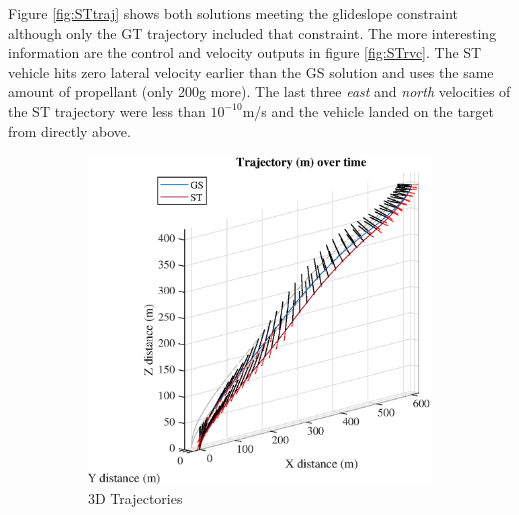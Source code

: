 Figure \ref{fig:STtraj} shows both solutions meeting the glideslope constraint although only the GT trajectory included that constraint. The more interesting information are the control and velocity outputs in figure \ref{fig:STrvc}. The ST vehicle hits zero lateral velocity earlier than the GS solution and uses the same amount of propellant (only 200g more). The last three \textit{east} and \textit{north} velocities of the ST trajectory were less than $10^{-10}$m/s and the vehicle landed on the target from directly above.

\begin{figure}[htpb!]
\begin{subfigure}{.5\textwidth}
  \centering
  \includegraphics[width=1\linewidth]{figs/ST_3dtraj.eps}
  \caption{3D Trajectories}
  \label{fig:ST_3dtraj}
\end{subfigure}%
\begin{subfigure}{.5\textwidth}
  \centering

\end{subfigure}
\end{figure}
